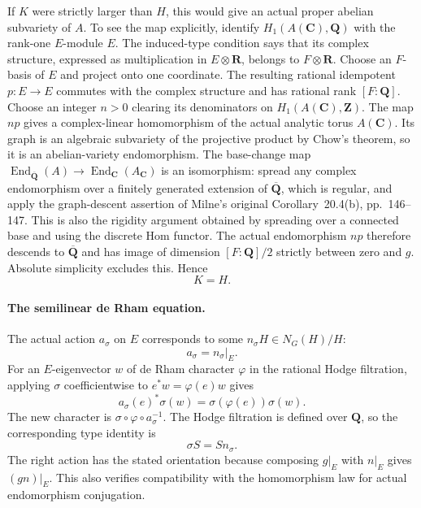 If $K$ were strictly larger than $H$, this would give
an actual proper abelian subvariety of $A$. To see the
map explicitly, identify $H_1(A(\mathbf C),\mathbf Q)$
with the rank-one $E$-module $E$. The induced-type
condition says that its complex structure, expressed
as multiplication in $E\otimes\mathbf R$, belongs to
$F\otimes\mathbf R$. Choose an $F$-basis of $E$ and
project onto one coordinate. The resulting rational
idempotent $p:E\to E$ commutes with the complex
structure and has rational rank $[F:\mathbf Q]$.
Choose an integer $n>0$ clearing its denominators on
$H_1(A(\mathbf C),\mathbf Z)$. The map $np$ gives a
complex-linear homomorphism of the actual analytic
torus $A(\mathbf C)$. Its graph is an algebraic
subvariety of the projective product by Chow's theorem,
so it is an abelian-variety endomorphism. The base-change
map
$\operatorname{End}_{\overline{\mathbf Q}}(A)
 \to\operatorname{End}_{\mathbf C}(A_{\mathbf C})$
is an isomorphism: spread any complex endomorphism over
a finitely generated extension of $\overline{\mathbf Q}$,
which is regular, and apply the graph-descent assertion
of Milne's original Corollary~20.4(b), pp.~146--147.
This is also the rigidity argument obtained by spreading
over a connected base and using the discrete Hom functor.
The actual endomorphism $np$ therefore descends to
$\overline{\mathbf Q}$ and has image of dimension
$[F:\mathbf Q]/2$ strictly between zero and $g$.
Absolute simplicity excludes this. Hence
\[
                              K=H.                        \tag{CMQ.2}
\]

\paragraph{The semilinear de Rham equation.}
The actual action $a_\sigma$ on $E$ corresponds to
some $n_\sigma H\in N_G(H)/H$:
\[
                       a_\sigma=n_\sigma|_E.
\]
For an $E$-eigenvector $w$ of de Rham character
$\varphi$ in the rational Hodge filtration, applying
$\sigma$ coefficientwise to $e^*w=\varphi(e)w$ gives
\[
             a_\sigma(e)^*\sigma(w)
                    =\sigma(\varphi(e))\sigma(w).
\]
The new character is
$\sigma\circ\varphi\circ a_\sigma^{-1}$.
The Hodge filtration is defined over $\mathbf Q$,
so the corresponding type identity is
\[
                         \sigma S=S n_\sigma.             \tag{CMQ.3}
\]
The right action has the stated orientation because
composing $g|_E$ with $n|_E$ gives $(gn)|_E$.
This also verifies compatibility with the
homomorphism law for actual endomorphism conjugation.


